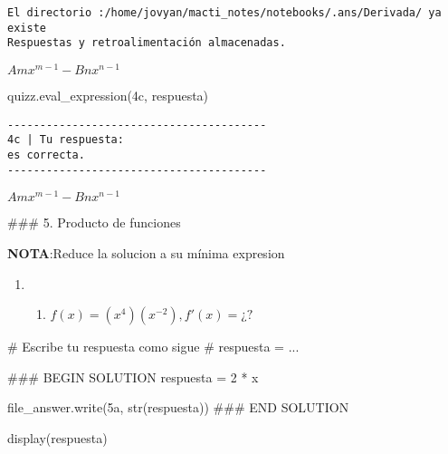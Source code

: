 \documentclass[
  letterpaper,
  DIV=11,
  numbers=noendperiod]{scrreprt}
\newenvironment{Shaded}{\begin{snugshade}}{\end{snugshade}}
\newcommand{\BuiltInTok}[1]{\textcolor[rgb]{0.00,0.23,0.31}{#1}}
\newcommand{\CommentTok}[1]{\textcolor[rgb]{0.37,0.37,0.37}{#1}}
\newcommand{\DecValTok}[1]{\textcolor[rgb]{0.68,0.00,0.00}{#1}}
\newcommand{\NormalTok}[1]{\textcolor[rgb]{0.00,0.23,0.31}{#1}}
\newcommand{\OperatorTok}[1]{\textcolor[rgb]{0.37,0.37,0.37}{#1}}
\newcommand{\RegionMarkerTok}[1]{\textcolor[rgb]{0.00,0.23,0.31}{#1}}
\newcommand{\StringTok}[1]{\textcolor[rgb]{0.13,0.47,0.30}{#1}}
\providecommand{\tightlist}{%
  \setlength{\itemsep}{0pt}\setlength{\parskip}{0pt}}\usepackage{longtable,booktabs,array}
\begin{document}
\begin{verbatim}
El directorio :/home/jovyan/macti_notes/notebooks/.ans/Derivada/ ya existe
Respuestas y retroalimentación almacenadas.
\end{verbatim}

$\displaystyle A m x^{m - 1} - B n x^{n - 1}$

\begin{Shaded}
\begin{Highlighting}[]
\NormalTok{quizz.eval\_expression(}\StringTok{\textquotesingle{}4c\textquotesingle{}}\NormalTok{, respuesta)}
\end{Highlighting}
\end{Shaded}

\begin{verbatim}
----------------------------------------
4c | Tu respuesta:
es correcta.
----------------------------------------
\end{verbatim}

$\displaystyle A m x^{m - 1} - B n x^{n - 1}$

\#\#\# 5. Producto de funciones

\textbf{NOTA}:Reduce la solucion a su mínima expresion

\begin{enumerate}
\def\labelenumi{\arabic{enumi}.}
\setcounter{enumi}{4}
\tightlist
\item
  \begin{enumerate}
  \def\labelenumii{\alph{enumii}.}
  \tightlist
  \item
    \(f(x) = (x^4)( x^{-2}), f'(x) = ¿?\)
  \end{enumerate}
\end{enumerate}

\begin{Shaded}
\begin{Highlighting}[]
\CommentTok{\# Escribe tu respuesta como sigue }
\CommentTok{\# respuesta = ...}

\CommentTok{\#\#\# }\RegionMarkerTok{BEGIN}\CommentTok{ SOLUTION}
\NormalTok{respuesta }\OperatorTok{=} \DecValTok{2} \OperatorTok{*}\NormalTok{ x}

\NormalTok{file\_answer.write(}\StringTok{\textquotesingle{}5a\textquotesingle{}}\NormalTok{, }\BuiltInTok{str}\NormalTok{(respuesta))}
\CommentTok{\#\#\# }\RegionMarkerTok{END}\CommentTok{ SOLUTION}

\NormalTok{display(respuesta)}
\end{Highlighting}
\end{Shaded}
\end{document}

